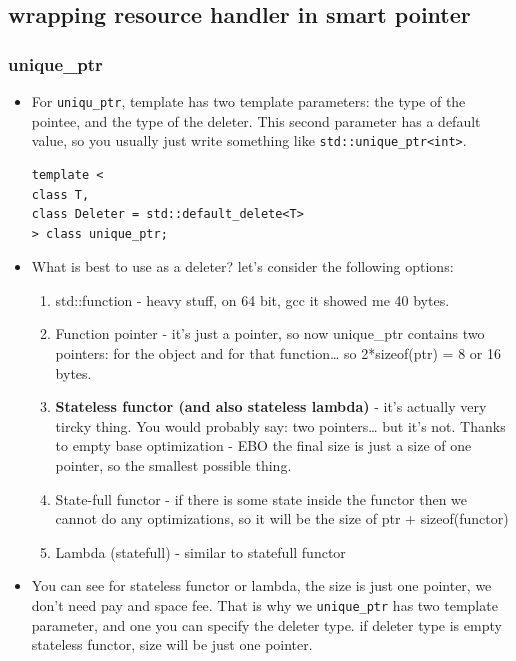 \documentclass[a4paper,11pt,twoside]{book}
\begin{document}
\subsection{wrapping resource handler in smart pointer}

\subsubsection{unique\_ptr}

\begin{itemize}
	\item For \texttt{uniqu\_ptr}, template has two template parameters: the type of the pointee, and the type of the deleter. This second parameter has a default value, so you usually just write something like \texttt{std::unique\_ptr<int>}.
\begin{lstlisting}
template <
class T,
class Deleter = std::default_delete<T>
> class unique_ptr;
	\end{lstlisting}

	\item What is best to use as a deleter? let's consider the following options:
	\begin{enumerate}
		\item std::function - heavy stuff, on 64 bit, gcc it showed me 40 bytes.
		\item Function pointer - it’s just a pointer, so now unique\_ptr contains two pointers: for the object and for that function… so 2*sizeof(ptr) = 8 or 16 bytes.
		
		\item \textbf{Stateless functor (and also stateless lambda)} - it’s actually very tircky thing. You would probably say: two pointers… but it’s not. Thanks to empty base optimization - EBO the final size is just a size of one pointer, so the smallest possible thing.
		
		\item State-full functor - if there is some state inside the functor then we cannot do any optimizations, so it will be the size of ptr + sizeof(functor)
		
		\item Lambda (statefull) - similar to statefull functor
	\end{enumerate}

	\item You can see for stateless functor or lambda, the size is just one pointer, we don't need pay and space fee. That is why we \texttt{unique\_ptr} has two template parameter, and one you can specify the deleter type. if deleter type is empty stateless functor, size will be just one pointer. 
	

\end{itemize}
\end{document}
